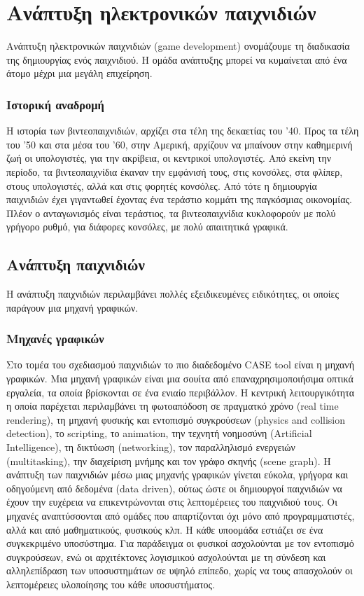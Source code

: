\chapter{Ανάπτυξη ηλεκτρονικών παιχνιδιών}
Ανάπτυξη ηλεκτρονικών παιχνιδιών (game development) ονομάζουμε τη διαδικασία της δημιουργίας ενός παιχνιδιού. Η ομάδα ανάπτυξης μπορεί να κυμαίνεται από ένα άτομο μέχρι μια μεγάλη επιχείρηση.	
	\subsection{Ιστορική αναδρομή}
	Η ιστορία των βιντεοπαιχνιδιών, αρχίζει στα τέλη της δεκαετίας του '40. Προς τα τέλη του '50 και στα μέσα του '60, στην Αμερική, αρχίζουν να μπαίνουν στην καθημερινή ζωή οι υπολογιστές, για την ακρίβεια, οι κεντρικοί υπολογιστές. Από εκείνη την περίοδο, τα βιντεοπαιχνίδια έκαναν την εμφάνισή τους, στις κονσόλες, στα φλίπερ, στους υπολογιστές, αλλά και στις φορητές κονσόλες. Από τότε η δημιουργία παιχνιδιών έχει γιγαντωθεί έχοντας ένα τεράστιο κομμάτι της παγκόσμιας οικονομίας.
	Πλέον ο ανταγωνισμός είναι τεράστιος, τα βιντεοπαιχνίδια κυκλοφορούν με πολύ γρήγορο ρυθμό, για διάφορες κονσόλες, με πολύ απαιτητικά γραφικά.
			
	\section{Ανάπτυξη παιχνιδιών}
	Η ανάπτυξη παιχνιδιών περιλαμβάνει πολλές εξειδικευμένες ειδικότητες, οι οποίες παράγουν μια μηχανή γραφικών.
	
	\subsection{Μηχανές γραφικών}	
	Στο τομέα του σχεδιασμού παιχνιδιών το πιο διαδεδομένο CASE tool είναι η μηχανή γραφικών. Μια μηχανή γραφικών είναι μια σουίτα από επαναχρησιμοποιήσιμα οπτικά εργαλεία, τα οποία βρίσκονται σε ένα ενιαίο περιβάλλον.
	Η κεντρική λειτουργικότητα η οποία παρέχεται περιλαμβάνει τη φωτοαπόδοση σε πραγματκό χρόνο (real time rendering), τη μηχανή φυσικής και εντοπισμό συγκρούσεων (physics and collision detection), το scripting, το animation, την τεχνητή νοημοσύνη (Artificial Intelligence), τη δικτύωση (networking), τον παραλληλισμό ενεργειών (multitasking), την διαχείριση μνήμης και τον γράφο σκηνής (scene graph). Η ανάπτυξη των παιχνιδιών μέσω μιας μηχανής γραφικών γίνεται εύκολα, γρήγορα και οδηγούμενη από δεδομένα (data driven), ούτως ώστε οι δημιουργοί παιχνιδιών να έχουν την ευχέρεια να επικεντρώνονται στις λεπτομέρειες του παιχνιδιού τους.
	Οι μηχανές αναπτύσσονται από ομάδες που απαρτίζονται όχι μόνο από προγραμματιστές, αλλά και από μαθηματικούς, φυσικούς κλπ. Η κάθε υποομάδα εστιάζει σε ένα συγκεκριμένο υποσύστημα. Για παράδειγμα οι φυσικοί ασχολούνται με τον εντοπισμό συγκρούσεων, ενώ οι αρχιτέκτονες λογισμικού ασχολούνται με τη σύνδεση και αλληλεπίδραση των υποσυστημάτων σε υψηλό επίπεδο, χωρίς να τους απασχολούν οι λεπτομέρειες υλοποίησης του κάθε υποσυστήματος.
	
